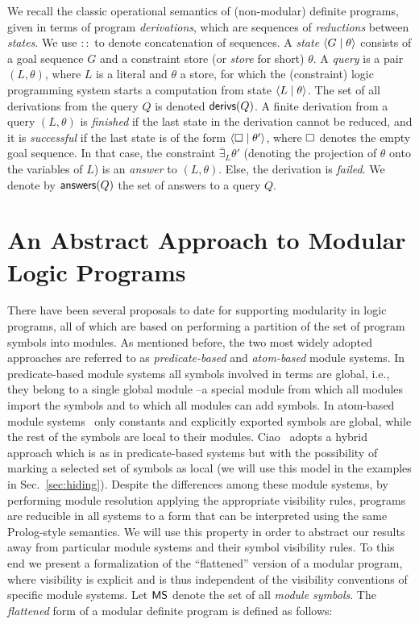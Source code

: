 \documentclass{llncs}
\begin{document}
We
recall
the classic operational semantics of
(non-modular) definite programs,
given in terms of program \emph{derivations}, which are sequences of
\emph{reductions} between \emph{states}.
%
We use $::$ to denote concatenation of sequences.
%
A \emph{state} $\langle G \mid{} \theta \rangle$ consists of a goal sequence $G$ and a
constraint store (or \emph{store} for short) $\theta$.
%
A \emph{query} is a pair $(L,\theta)$, where $L$ is a literal and
$\theta$ a store, for which the (constraint) logic programming system
starts a computation from state $\langle L \mid{} \theta \rangle$.
%
The set of all derivations from the query $Q$ is denoted
$\textsf{derivs}(Q)$.
%
A finite derivation from a query $(L,\theta)$ is
\emph{finished} if the last state in the derivation cannot be
reduced,
%
and it is
\emph{successful} if the last state is of the form
$\langle \square \mid{} \theta' \rangle$, where $\square$ denotes the empty
goal sequence.
%
In that case, the constraint $\bar{\exists}_{L}\theta'$
(denoting the projection of $\theta$ onto the variables of $L$) is an
\emph{answer} to $(L,\theta)$.
%
Else, the derivation is \emph{failed}.
%
We denote by $\textsf{answers}(Q)$ the set of answers to a query $Q$.




\section{An Abstract Approach to Modular Logic Programs}


There have been several proposals to date for supporting modularity in
logic programs, all of which are based on performing a partition of
the set of program symbols into modules.
%
As mentioned before, the two most widely adopted approaches are
referred to as \emph{predicate-based} and \emph{atom-based} module
systems.
%
In predicate-based module systems all symbols involved in
terms are global, i.e., they belong to a single global 
module --a special module from which all modules import the symbols
and to which all modules can add symbols.
%
In atom-based module systems~\cite{xsb-journal-2012}
only constants and explicitly exported symbols are global,
while the rest of the symbols are local to their modules.
%
Ciao~\cite{ciao-modules-cl2000-short} adopts a hybrid approach
which is as in predicate-based systems but
with the possibility of marking a selected set of symbols as local (we
will use this model in the examples in Sec.~\ref{sec:hiding}).
%
Despite the differences among these module systems,
by performing module resolution applying the appropriate visibility
rules, programs are reducible in all systems to a form that can be
interpreted using the same Prolog-style semantics.
%
We will use this property in order to abstract our results away from
particular module systems and their symbol visibility rules. To this
end we present a formalization of the ``flattened'' version of a
modular program, where visibility is explicit and is thus independent
of the visibility conventions of specific module systems.
%
Let $\textsf{MS}$ denote the set of all \emph{module symbols}.
%
The \emph{flattened}
form of a modular definite program is
defined as follows:
\end{document}
